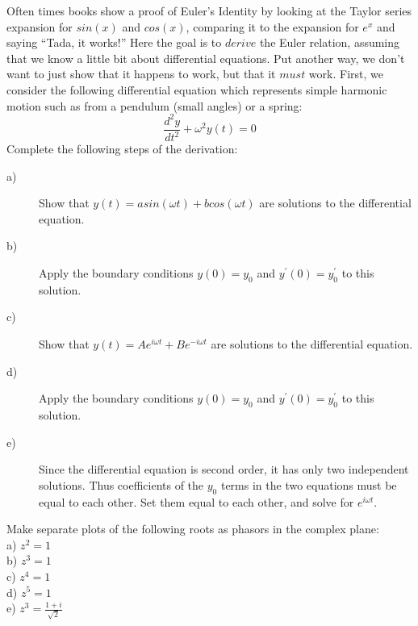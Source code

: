 \begin{problems}
Often times books show a proof of Euler's Identity by
looking at the Taylor series expansion for $sin(x)$ and
$cos(x)$, comparing it to the expansion for $e^x$ and
saying ``Tada, it works!''  Here the goal is to 
$derive$ the Euler relation,
assuming that we know a little bit about differential
equations.  Put another way, we don't want to just show
that it happens to work, but that it $must$ work.
First, we consider the following differential
equation which represents simple harmonic motion such
as from a pendulum (small angles) or a spring:
\[
\frac{d^2y}{dt^2} + {\omega}^2 y(t) = 0
\]
Complete the following steps of the derivation:\\
\begin{description}
\item[a)]Show that $y(t)= a sin( \omega t) + b cos( \omega t)$
are solutions to the differential equation.
\item[b)]Apply the boundary conditions $y(0)=y_0$ and
$y^{\prime}(0) = y^{\prime}_0$ to this solution.
\item[c)]Show that $y(t)= A e^{i \omega t} + B e^{-i \omega t}$
are solutions to the differential equation.
\item[d)]Apply the boundary conditions $y(0)=y_0$ and
$y^{\prime}(0) = y^{\prime}_0$ to this solution.
\item[e)]Since the differential equation is second order, it
has only two independent solutions.  Thus coefficients of
the $y_0$ terms in the two equations must be equal to each
other.  Set them equal to each other, and solve for
$e^{i \omega t}$.
\end{description}
\end{problems}

\begin{problems}
Make separate plots of the following roots 
as phasors in the complex plane:\\
a)      $z^2 = 1$\\     
b)      $z^3 = 1$\\     
c)      $z^4 = 1$\\     
d)      $z^5 = 1$\\     
e)      $z^3 = \frac{1+i}{\sqrt{2}}$\\
\end{problems}
